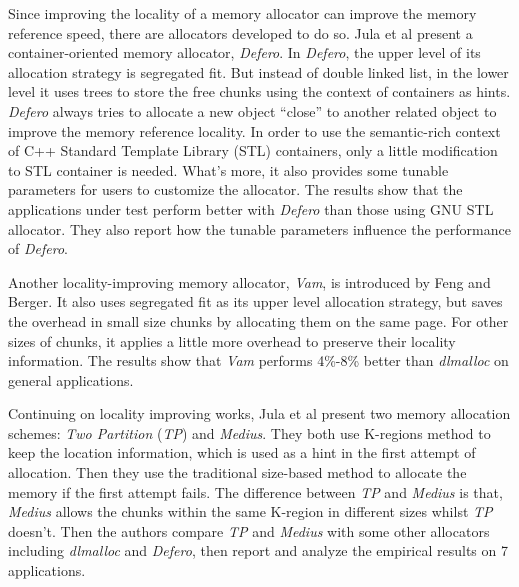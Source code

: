 Since improving the locality of a memory allocator can improve the memory reference speed, there are allocators developed to do so. Jula et al\cite{Jula2007} present a container-oriented memory allocator, \emph{Defero}. In \emph{Defero}, the upper level of its allocation strategy is segregated fit. But instead of double linked list, in the lower level it uses trees to store the free chunks using the context of containers as hints. \emph{Defero} always tries to allocate a new object ``close'' to another related object to improve the memory reference locality. In order to use the semantic-rich context of C++ Standard Template Library (STL) containers, only a little modification to STL container is needed. What's more, it also provides some tunable parameters for users to customize the allocator. The results show that the applications under test perform better with \emph{Defero} than those using GNU STL allocator. They also report how the tunable parameters influence the performance of \emph{Defero}.

Another locality-improving memory allocator, \emph{Vam}, is introduced by Feng and Berger\cite{Feng:2005:LDM:1111583.1111594}. It also uses segregated fit as its upper level allocation strategy, but saves the overhead in small size chunks by allocating them on the same page. For other sizes of chunks, it applies a little more overhead to preserve their locality information. The results show that \emph{Vam} performs 4\%-8\% better than \emph{dlmalloc} on general applications.

Continuing on locality improving works, Jula et al\cite{Jula:2009:TMA:1542431.1542447} present two memory allocation schemes: \emph{Two Partition} (\emph{TP}) and \emph{Medius}. They both use K-regions method to keep the location information, which is used as a hint in the first attempt of allocation. Then they use the traditional size-based method to allocate the memory if the first attempt fails. The difference between \emph{TP} and \emph{Medius} is that, \emph{Medius} allows the chunks within the same K-region in different sizes whilst \emph{TP} doesn't. Then the authors compare \emph{TP} and \emph{Medius} with some other allocators including \emph{dlmalloc} and \emph{Defero}, then report and analyze the empirical results on 7 applications.

